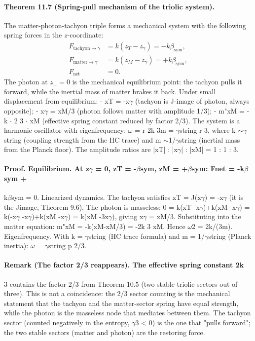 \paragraph*{Theorem 11.7 (Spring-pull mechanism of the triolic system).}
The matter-photon-tachyon triple forms a mechanical system with the following spring forces in the $z$-coordinate:
\[
\begin{aligned}
F_{\mathrm{tachyon}\to\gamma} &= k(z_T-z_\gamma) = -k\beta_{\mathrm{sym}},\\
F_{\mathrm{matter}\to\gamma} &= k(z_M-z_\gamma) = +k\beta_{\mathrm{sym}},\\
F_{\mathrm{net}} &= 0.
\end{aligned}
\]
The photon at $z_-=0$ is the mechanical equilibrium point: the tachyon pulls it forward, while the inertial mass of matter brakes it back. Under small displacement from equilibrium:
- xT = -x$\gamma$ (tachyon is J-image of photon, always opposite);
- x$\gamma$ = xM/3 (photon follows matter with amplitude 1/3);
- m"xM = -k $\cdot$ 2
3 $\cdot$ xM (effective spring constant reduced by factor 2/3). The system is a harmonic oscillator with eigenfrequency: $\omega$ = r 2k 3m = $\gamma$string r 3, where k $\sim$$\gamma$string (coupling strength from the HC trace) and m $\sim$1/$\gamma$string (inertial mass from the Planck floor). The amplitude ratios are |xT| : |x$\gamma$| : |xM| = 1 : 1 : 3.
\paragraph*{Proof. Equilibrium. At z$\gamma$ = 0, zT = -$\beta$sym, zM = +$\beta$sym: Fnet = -k$\beta$sym +}
k$\beta$sym = 0. Linearized dynamics. The tachyon satisfies xT = J(x$\gamma$) = -x$\gamma$ (it is the Jimage, Theorem 9.6). The photon is masseless: 0 = k(xT -x$\gamma$)+k(xM -x$\gamma$) = k(-x$\gamma$ -x$\gamma$)+k(xM -x$\gamma$) = k(xM -3x$\gamma$), giving x$\gamma$ = xM/3. Substituting into the matter equation: m"xM = -k(xM-xM/3) = -2k 3 xM. Hence $\omega$2 = 2k/(3m). Eigenfrequency. With k = $\gamma$string (HC trace formula) and m = 1/$\gamma$string (Planck inertia): $\omega$ = $\gamma$string p 2/3.
\paragraph*{Remark (The factor 2/3 reappears). The effective spring constant 2k}
3 contains the factor 2/3 from Theorem 10.5 (two stable triolic sectors out of three). This is not a coincidence: the 2/3 sector counting is the mechanical statement that the tachyon and the matter-sector spring have equal strength, while the photon is the masseless node that mediates between them. The tachyon sector (counted negatively in the entropy, $\gamma$3 < 0) is the one that "pulls forward"; the two stable sectors (matter and photon) are the restoring force.
